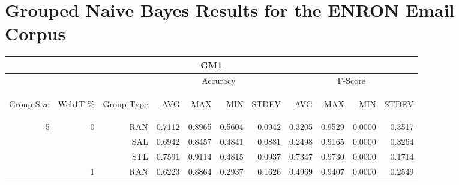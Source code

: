 \chapter{Grouped Naive Bayes Results for the ENRON Email Corpus}

\begin{center}
\begin{table}[htbp]
\begin{tabular}{ | r | r | r | r | r | r | r | r | r | r | r |}
\hline
\multicolumn{11}{|c|}{GM1}\\
\hline
 & & & \multicolumn{4}{|c|}{Accuracy} & \multicolumn{4}{|c|}{F-Score}\\ \cline{4-11}
\begin{sideways}Group Size\end{sideways} & \begin{sideways}Web1T \%\end{sideways} & \begin{sideways}Group Type\end{sideways} & \begin{sideways}AVG\end{sideways} & \begin{sideways}MAX\end{sideways} & \begin{sideways}MIN\end{sideways} & \begin{sideways}STDEV\end{sideways} & \begin{sideways}AVG\end{sideways} & \begin{sideways}MAX\end{sideways} & \begin{sideways}MIN\end{sideways} & \begin{sideways}STDEV\end{sideways}\\
\hline
\multirow{18}{*}{5}
 & \multirow{3}{*}{0} & RAN & 0.7112 & 0.8965 & 0.5604 & 0.0942 & 0.3205 & 0.9529 & 0.0000 & 0.3517\\ \cline{3-11}
 &   & SAL & 0.6942 & 0.8457 & 0.4841 & 0.0881 & 0.2498 & 0.9165 & 0.0000 & 0.3264\\ \cline{3-11}
 &   & STL & 0.7591 & 0.9114 & 0.4815 & 0.0937 & 0.7347 & 0.9730 & 0.0000 & 0.1714\\ \cline{2-11}
 & \multirow{3}{*}{1} & RAN & 0.6223 & 0.8864 & 0.2937 & 0.1626 & 0.4969 & 0.9407 & 0.0000 & 0.2549\\ \cline{3-11}

\end{tabular}
\end{table}
\end{center}
